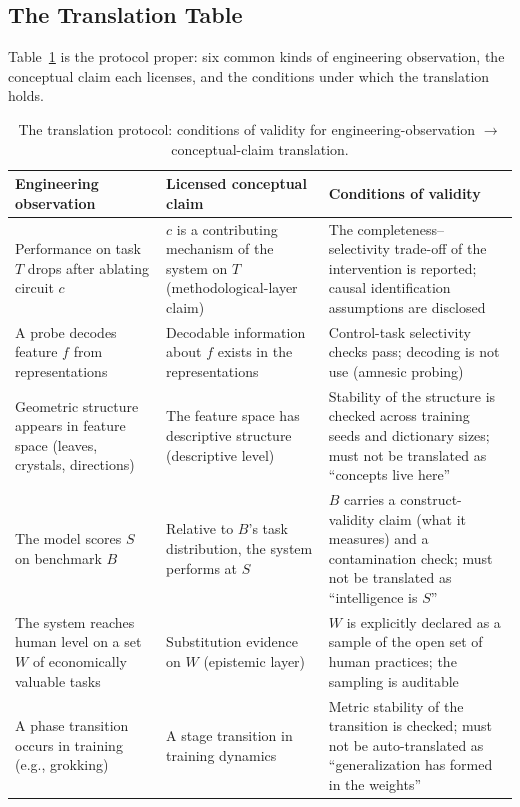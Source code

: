 \documentclass[10pt]{article}
\begin{document}
\subsection{The Translation Table}

Table~\ref{tab:protocol} is the protocol proper: six common kinds of engineering observation, the conceptual claim each licenses, and the conditions under which the translation holds.

\begin{table}[t]
\centering
\caption{The translation protocol: conditions of validity for engineering-observation $\to$ conceptual-claim translation.}
\label{tab:protocol}
\small
\begin{tabularx}{\textwidth}{p{3.6cm} X p{4.2cm}}
\toprule
Engineering observation & Licensed conceptual claim & Conditions of validity \\
\midrule
Performance on task $T$ drops after ablating circuit $c$ & $c$ is a contributing mechanism of the system on $T$ (methodological-layer claim) & The completeness--selectivity trade-off of the intervention is reported\cite{canby2024reliable}; causal identification assumptions are disclosed\cite{lin2026disclose} \\
A probe decodes feature $f$ from representations & Decodable information about $f$ exists in the representations & Control-task selectivity checks pass\cite{hewitt2019designing}; decoding is not use (amnesic probing)\cite{belinkov2022probing} \\
Geometric structure appears in feature space (leaves, crystals, directions) & The feature space has descriptive structure (descriptive level) & Stability of the structure is checked across training seeds and dictionary sizes\cite{leask2025canonical}; must not be translated as ``concepts live here'' \\
The model scores $S$ on benchmark $B$ & Relative to $B$'s task distribution, the system performs at $S$ & $B$ carries a construct-validity claim (what it measures) and a contamination check\cite{bean2025measuring,zhang2024gsm1k}; must not be translated as ``intelligence is $S$'' \\
The system reaches human level on a set $W$ of economically valuable tasks & Substitution evidence on $W$ (epistemic layer) & $W$ is explicitly declared as a sample of the open set of human practices\cite{yu2026theory}; the sampling is auditable\cite{yu2026methodology} \\
A phase transition occurs in training (e.g., grokking\cite{power2022grokking}) & A stage transition in training dynamics & Metric stability of the transition is checked\cite{schaeffer2023mirage}; must not be auto-translated as ``generalization has formed in the weights''\cite{nanda2023progress} \\
\bottomrule
\end{tabularx}
\end{table}
\end{document}
